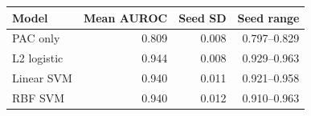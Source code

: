 \begin{tabular}{lrrr}
\toprule
Model & Mean AUROC & Seed SD & Seed range \\
\midrule
PAC only & 0.809 & 0.008 & 0.797--0.829 \\
L2 logistic & 0.944 & 0.008 & 0.929--0.963 \\
Linear SVM & 0.940 & 0.011 & 0.921--0.958 \\
RBF SVM & 0.940 & 0.012 & 0.910--0.963 \\
\bottomrule
\end{tabular}
